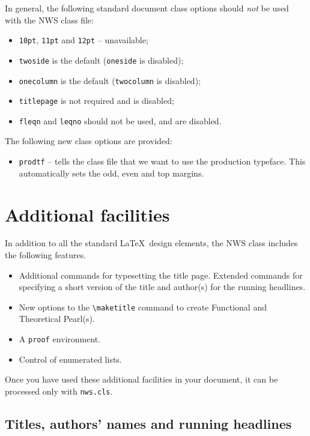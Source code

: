 \documentclass{article}
\begin{document}
In general, the following standard document class options should \emph{not} be
used with the NWS class file:
%
\begin{itemize}
  \item \texttt{10pt}, \texttt{11pt} and \texttt{12pt} -- unavailable;
  \item \texttt{twoside} is the default (\texttt{oneside} is disabled);
  \item \texttt{onecolumn} is the default (\texttt{twocolumn} is disabled);
  \item \texttt{titlepage} is not required and is disabled;
  \item \texttt{fleqn} and \texttt{leqno} should not be used, and are disabled.
\end{itemize}
%
\ifprodtf
The following new class options are provided:
\begin{itemize}
  \item \texttt{prodtf} -- tells the class file that we want to use the
    production typeface. This automatically sets the odd, even and top
    margins.
\end{itemize}
\fi

\section{Additional facilities}

In addition to all the standard \LaTeX\ design elements, the NWS class
includes the following features.
%
\begin{itemize}
  \item Additional commands for typesetting the title page. Extended
        commands for specifying a short version of the title and author(s)
        for the running headlines.
  \item New options to the \verb"\maketitle" command to create Functional and
        Theoretical Pearl(s).
  \item A \verb"proof" environment.
  \item Control of enumerated lists.
\end{itemize}
%
Once you have used these additional facilities in your document,
it can be processed only with \verb"nws.cls".

\subsection{Titles, authors' names and running headlines}
\end{document}
